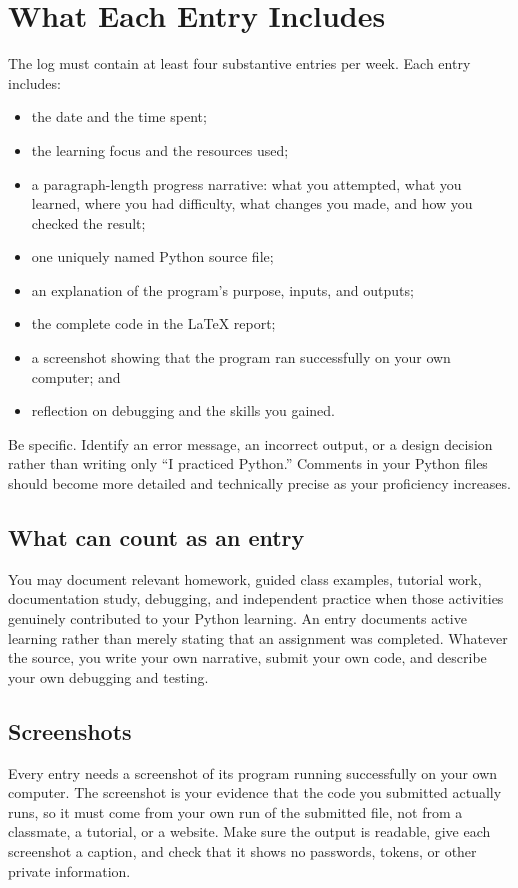 \documentclass[11pt]{article}
\begin{document}
\section{What Each Entry Includes}
The log must contain at least four substantive entries per week. Each entry includes:
\begin{itemize}
  \item the date and the time spent;
  \item the learning focus and the resources used;
  \item a paragraph-length progress narrative: what you attempted, what you learned, where you had difficulty, what changes you made, and how you checked the result;
  \item one uniquely named Python source file;
  \item an explanation of the program's purpose, inputs, and outputs;
  \item the complete code in the \LaTeX{} report;
  \item a screenshot showing that the program ran successfully on your own computer; and
  \item reflection on debugging and the skills you gained.
\end{itemize}
Be specific. Identify an error message, an incorrect output, or a design decision rather than writing only ``I practiced Python.'' Comments in your Python files should become more detailed and technically precise as your proficiency increases.

\subsection{What can count as an entry}
You may document relevant homework, guided class examples, tutorial work, documentation study, debugging, and independent practice when those activities genuinely contributed to your Python learning. An entry documents active learning rather than merely stating that an assignment was completed. Whatever the source, you write your own narrative, submit your own code, and describe your own debugging and testing.

\subsection{Screenshots}
Every entry needs a screenshot of its program running successfully on your own computer. The screenshot is your evidence that the code you submitted actually runs, so it must come from your own run of the submitted file, not from a classmate, a tutorial, or a website. Make sure the output is readable, give each screenshot a caption, and check that it shows no passwords, tokens, or other private information.
\end{document}
